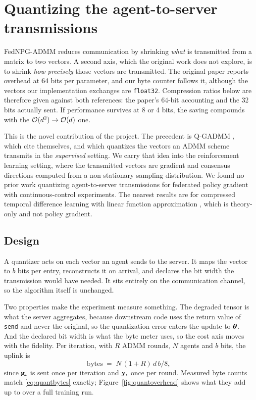 \FloatBarrier
\section{Quantizing the agent-to-server transmissions}
\label{sec:quantization}

FedNPG-ADMM reduces communication by shrinking \emph{what} is transmitted from
a matrix to two vectors. A second axis, which the original work does not
explore, is to shrink \emph{how precisely} those vectors are transmitted. The
original paper reports overhead at 64 bits per parameter, and our byte counter follows
it, although the vectors our implementation exchanges are \texttt{float32}.
Compression ratios below are therefore given against both references: the
paper's 64-bit accounting and the 32 bits actually sent. If performance
survives at 8 or 4 bits, the saving compounds with the $\mathcal{O}(d^2) \to \mathcal{O}(d)$
one.

This is the novel contribution of the project. The precedent is Q-GADMM
\citep{elgabli2021qgadmm}, which \citet{lan2023fednpgadmm} cite themselves, and
which quantizes the vectors an ADMM scheme transmits in the \emph{supervised}
setting. We carry that idea into the reinforcement learning setting, where the
transmitted vectors are gradient and consensus directions computed from a
non-stationary sampling distribution. We found no prior work quantizing
agent-to-server transmissions for federated policy gradient with
continuous-control experiments. The nearest results are for compressed temporal
difference learning with linear function approximation
\citep{mitra2024compressedtd}, which is theory-only and not policy gradient.

\subsection{Design}

A quantizer acts on each vector an agent sends to the server. It maps the
vector to $b$ bits per entry, reconstructs it on arrival, and declares the bit
width the transmission would have needed. It sits entirely on the
communication channel, so the algorithm itself is unchanged.

Two properties make the experiment measure something. The degraded tensor is
what the server aggregates, because downstream code uses the return value of
\texttt{send} and never the original, so the quantization error enters the
update to $\boldsymbol{\theta}$. And the declared bit width is what the
byte meter uses, so the cost axis moves with the fidelity. Per iteration, with
$R$ ADMM rounds, $N$ agents and $b$ bits, the uplink is
\begin{equation}
  \text{bytes} \;=\; N \,(1 + R)\, d \, b / 8,
  \label{eq:quantbytes}
\end{equation}
since $\mathbf{g}_i$ is sent once per iteration and $\mathbf{y}_i$ once per round. Measured
byte counts match \eqref{eq:quantbytes} exactly; Figure~\ref{fig:quantoverhead}
shows what they add up to over a full training run.

